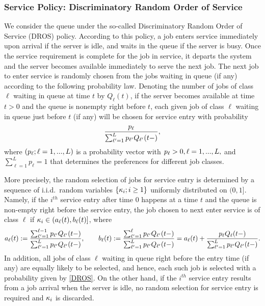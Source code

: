 \documentclass{article}
\theoremstyle{definition}
\numberwithin{equation}{section}
\begin{document}
\subsubsection*{Service Policy: Discriminatory Random Order of Service}
We consider the queue under the so-called Discriminatory Random Order of Service (DROS) policy. According to this policy, a job  enters service immediately upon arrival if the server is idle, and waits in the queue if the server is busy. Once the service requirement is complete for the job in service, it departs the system and the server becomes available immediately to serve the next job. The next job to enter service is randomly chosen from the jobs waiting in queue (if any) according to the following probability law. Denoting the number of jobs of class $\ell$ waiting in queue at time $t$ by $Q_\ell(t)$, if the server becomes available at time $t>0$ and the queue is nonempty right before $t$, each given job of class $\ell$ waiting in queue just before $t$ (if any) will be chosen for service entry with probability
\begin{equation}\label{DROS}
\frac{p_\ell}{\sum_{\ell'=1}^Lp_{\ell'}Q_{\ell'}(t-)},
\end{equation}
where $(p_\ell;\ell=1,...,L)$ is a probability vector with $p_\ell>0,\ell=1,...,L,$ and $\sum_{\ell=1}^Lp_{\ell}=1$ that determines the preferences for different job classes.

More precisely, the random selection of jobs for service entry is determined by a sequence of i.i.d.\ random variables $\{\kappa_i;i\geq1\}$ uniformly distributed on $(0,1]$. Namely, if the $i^{th}$ service entry after time $0$ happens at a time $t$ and the queue is non-empty right before the service entry, the job chosen to next enter service is of class $\ell$ if
$\kappa_i\in(a_\ell(t),b_\ell(t)]$, where
\begin{equation}\label{def_class_interval}
	a_\ell (t) := \frac{\sum_{\ell'=1}^{\ell-1}p_{\ell'}Q_{\ell'}(t-)}{\sum_{\ell'=1}^{L}p_{\ell'}Q_{\ell'}(t-)},\quad\quad 	b_\ell (t):= \frac{\sum_{\ell'=1}^{\ell}p_{\ell'}Q_{\ell'}(t-)}{\sum_{\ell'=1}^{L}p_{\ell'}Q_{\ell'}(t-)}= 	a_\ell (t)+ \frac{p_{\ell}Q_{\ell}(t-)}{\sum_{\ell'=1}^{L}p_{\ell'}Q_{\ell'}(t-)}.
\end{equation}
In addition, all jobs of class $\ell$ waiting in queue right before the entry time  (if any) are equally likely to be selected, and hence, each such job is selected with a probability given by \eqref{DROS}.  On the other hand, if the $i^{th}$ service entry results from a job arrival when the server is idle, no random selection for service entry is required and $\kappa_i$ is discarded.
\end{document}
